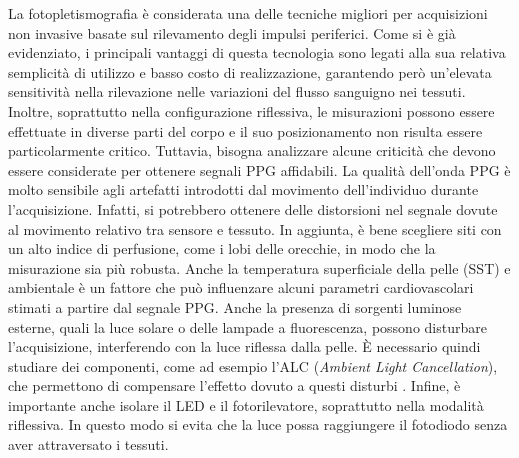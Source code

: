 La fotopletismografia è considerata una delle tecniche migliori per acquisizioni non invasive basate sul rilevamento degli impulsi periferici\cite{Nenova2009}. Come si è già evidenziato, i principali vantaggi di questa tecnologia sono legati alla sua relativa semplicità di utilizzo e basso costo di realizzazione, garantendo però un'elevata sensitività nella rilevazione nelle variazioni del flusso sanguigno nei tessuti. Inoltre, soprattutto nella configurazione riflessiva, le misurazioni possono essere effettuate in diverse parti del corpo e il suo posizionamento non risulta essere particolarmente critico. Tuttavia, bisogna analizzare alcune criticità che devono essere considerate per ottenere segnali PPG affidabili. La qualità dell'onda PPG è molto sensibile agli artefatti introdotti dal movimento dell'individuo durante l'acquisizione. Infatti, si potrebbero ottenere delle distorsioni nel segnale dovute al movimento relativo tra sensore e tessuto. In aggiunta, è bene scegliere siti con un alto indice di perfusione, come i lobi delle orecchie, in modo che la misurazione sia più robusta. Anche la temperatura superficiale della pelle (SST) e ambientale è un fattore che può influenzare alcuni parametri cardiovascolari stimati a partire dal segnale PPG\cite{Jeong2014}. Anche la presenza di sorgenti luminose esterne, quali la luce solare o delle lampade a fluorescenza, possono disturbare l'acquisizione, interferendo con la luce riflessa dalla pelle. \`E necessario quindi studiare dei componenti, come ad esempio l'ALC (\textit{Ambient Light Cancellation}), che permettono di compensare l'effetto dovuto a questi disturbi \cite{Kim2015}. Infine, è importante anche isolare il LED e il fotorilevatore, soprattutto nella modalità riflessiva. In questo modo si evita che la luce possa raggiungere il fotodiodo senza aver attraversato i tessuti.
\pagebreak